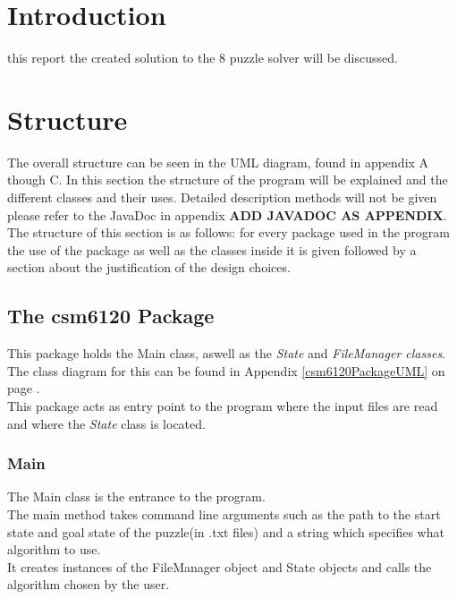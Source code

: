 \documentclass[journal]{IEEEtran}
\begin{document}
\section{Introduction}
% 
% 
% 
% 
 this report the  created solution to the 8 puzzle solver will be discussed.

\section{Structure}
The overall structure can be seen in the UML diagram, found in appendix A though C.
In this section the structure of the program will be explained and the different classes and their uses. Detailed description methods will not be given please refer to the JavaDoc in appendix \textbf{ADD JAVADOC AS APPENDIX}.\\
The structure of this section is as follows: for every package used in the program the use of the package as well as the classes inside it is given followed by a section about the justification of the design choices. 

\subsection{The csm6120 Package}\label{sec:csm6120Package}
This package holds the Main class, aswell as the \textit{State} and \textit{FileManager classes}. \\
The class diagram for this can be found in Appendix \ref{csm6120PackageUML} on page \pageref{csm6120PackageUML}.\\
This package acts as entry point to the program where the input files are read and where the \textit{State} class is located. \\

\subsubsection{Main}
The Main class is the entrance to the program. \\
The main method takes command line arguments such as the path to the start state and goal state of the puzzle(in .txt files) and a string which specifies what algorithm to use. \\
It creates instances of the FileManager object and State objects and calls the algorithm chosen by the user.\\
\end{document}
